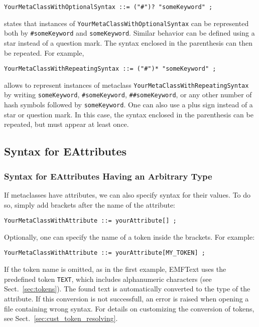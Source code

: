 \begin{lstlisting}
YourMetaClassWithOptionalSyntax ::= ("#")? "someKeyword" ;
\end{lstlisting}

states that instances of \texttt{YourMetaClassWithOptionalSyntax} can be
represented both by \texttt{\#someKeyword} and \texttt{someKeyword}. Similar
behavior can be defined using a star instead of a question mark. The syntax 
enclosed in the parenthesis can then be repeated. For example,

\begin{lstlisting}
YourMetaClassWithRepeatingSyntax ::= ("#")* "someKeyword" ;
\end{lstlisting}

allows to represent instances of metaclass
\texttt{YourMetaClassWithRepeatingSyntax} by writing \texttt{someKeyword},
\texttt{\#someKeyword}, \texttt{\#\#someKeyword}, or any other number of hash
symbols followed by \texttt{someKeyword}.
One can also use a plus sign instead of a star or question mark. In this case,
the syntax enclosed in the parenthesis can be repeated, but must appear at least
once.

\subsection{Syntax for EAttributes}

\subsubsection{Syntax for EAttributes Having an Arbitrary Type}

If metaclasses have attributes, we can also specify syntax for their values. 
To do so, simply add brackets after the name of the attribute:

\begin{lstlisting}
YourMetaClassWithAttribute ::= yourAttribute[] ;
\end{lstlisting}

Optionally, one can specify the name of a token inside the brackets. For example:

\begin{lstlisting}
YourMetaClassWithAttribute ::= yourAttribute[MY_TOKEN] ;
\end{lstlisting}

If the token name is omitted, as in the first example, EMFText uses the 
predefined token \texttt{TEXT}, which includes alphanumeric characters (see 
Sect.~\ref{sec:tokens}). The
found text is automatically converted to the type of the attribute. If this 
conversion is not successfull, an error is raised when opening a file containing 
wrong syntax. For details on customizing the conversion of tokens, see
Sect.~\ref{sec:cust_token_resolving}.

